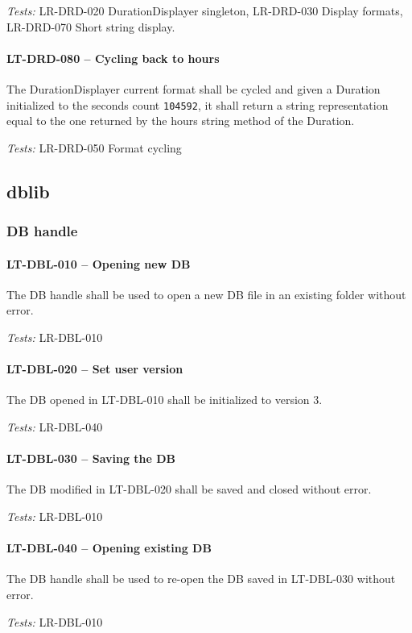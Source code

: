 \textit{Tests: } LR-DRD-020 DurationDisplayer singleton,
LR-DRD-030 Display formats, LR-DRD-070 Short string
display.

\paragraph{LT-DRD-080 -- Cycling back to hours}
The DurationDisplayer current format shall be cycled and
given a Duration initialized to the seconds count \lstinline{104592},
it shall return a string representation equal to the one returned
by the hours string method of the Duration.

\textit{Tests: } LR-DRD-050 Format cycling

\subsection{db\textunderscore lib}
\subsubsection{DB handle}
\paragraph{LT-DBL-010 -- Opening new DB}
The DB handle shall be used to open a new DB file in an existing
folder without error.

\textit{Tests: } LR-DBL-010

\paragraph{LT-DBL-020 -- Set user version}
The DB opened in LT-DBL-010 shall be initialized to version 3.

\textit{Tests: } LR-DBL-040

\paragraph{LT-DBL-030 -- Saving the DB}
The DB modified in LT-DBL-020 shall be saved and closed without error.

\textit{Tests: } LR-DBL-010

\paragraph{LT-DBL-040 -- Opening existing DB}
The DB handle shall be used to re-open the DB saved in LT-DBL-030
without error.

\textit{Tests: } LR-DBL-010


